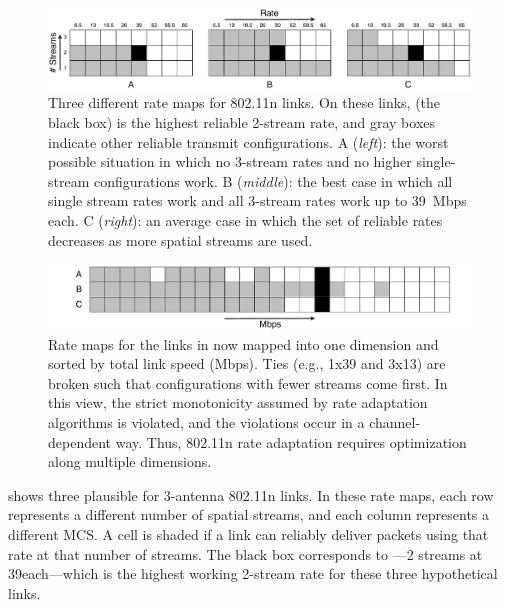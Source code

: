 \begin{figure}[t]
      \centering
      \includegraphics[width=\textwidth]{figures/rate_table_2d.pdf}
      \caption[Three different rate maps for 802.11n links]{\label{fig:rate_table_2d}Three different rate maps for 802.11n links. On these links,  (the black box) is the highest reliable 2-stream rate, and gray boxes indicate other reliable transmit configurations. A (\emph{left}): the worst possible situation in which no 3-stream rates and no higher single-stream configurations work. B (\emph{middle}): the best case in which all single stream rates work and all 3-stream rates work up to 39~Mbps each. C (\emph{right}): an average case in which the set of reliable rates decreases as more spatial streams are used.}
\end{figure}
\begin{figure}[t]
      \centering
      \includegraphics[width=\textwidth]{figures/rate_table_1d.pdf}
      \caption[Rate maps for the links in  mapped into one dimension]{\label{fig:rate_table_1d}Rate maps for the links in  now mapped into one dimension and sorted by total link speed (Mbps). Ties (e.g., 1x39 and 3x13) are broken such that configurations with fewer streams come first. In this view, the strict monotonicity assumed by rate adaptation algorithms is violated, and the violations occur in a channel-dependent way. Thus, 802.11n rate adaptation requires optimization along multiple dimensions.}
\end{figure}

 shows three plausible  for 3-antenna 802.11n links. In these rate maps, each row represents a different number of spatial streams, and each column represents a different MCS. A cell is shaded if a link can reliably deliver packets using that rate at that number of streams. The black box corresponds to ---2 streams at 39\Mbps each---which is the highest working 2-stream rate for these three hypothetical links.

